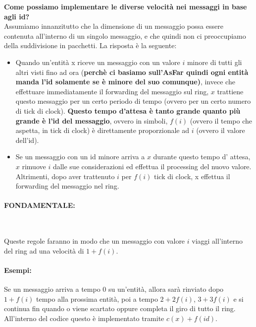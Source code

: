 \textbf{Come possiamo implementare le diverse velocità nei messaggi
    in base agli id?}\\
Assumiamo innanzitutto che la dimensione di un messaggio possa essere contenuta
all'interno di un singolo messaggio, e che quindi non ci preoccupiamo della
suddivisione in pacchetti. La risposta è la seguente:
\begin{itemize}
    \item Quando un'entità x riceve un messaggio con un valore $i$ minore di tutti
          gli altri visti fino ad ora (\textbf{perchè ci basiamo sull'AsFar quindi ogni
              entità manda l'id solamente se è minore del suo comunque)}, invece che
          effettuare immediatamente il forwarding del messaggio sul ring, $x$ trattiene
          questo messaggio per un certo periodo di tempo (ovvero per un certo numero di
          tick di clock). \textbf{Questo tempo d'attesa è tanto grande quanto più grande
              è l'id del messaggio}, ovvero in simboli, $f(i)$ (ovvero il tempo che aspetta,
          in tick di clock) è direttamente proporzionale ad $i$ (ovvero il valore
          dell'id).
    \item Se un messaggio con un id minore arriva a $x$ durante questo tempo d'
          attesa, $x$ rimuove $i$ dalle sue considerazioni ed effettua il processing del
          nuovo valore. Altrimenti, dopo aver trattenuto $i$ per $f(i)$ tick di clock, x
          effettua il forwarding del messaggio nel ring.
\end{itemize}

\paragraph{FONDAMENTALE:}\ \\
\begin{center}
    Queste regole faranno in modo che un messaggio con valore $i$ viaggi
    all'interno del ring ad una velocità di $1+f(i)$.
\end{center}

\paragraph{Esempi:} Se un messaggio arriva a tempo $0$ su un'entità, allora sarà
rinviato dopo $1+f(i)$ tempo alla prossima entità, poi a tempo $2+2f(i)$,
$3+3f(i)$ e si continua fin quando o viene scartato oppure completa il giro di
tutto il ring. All'interno del codice questo è implementato tramite
$c(x)+f(id).$

